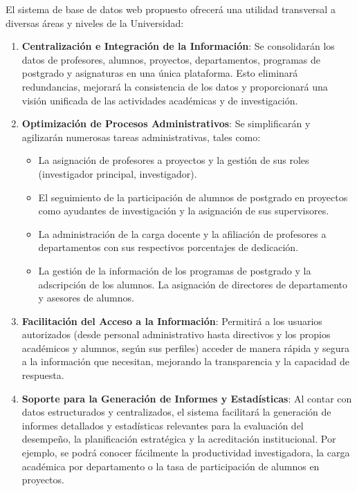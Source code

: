 El sistema de base de datos web propuesto ofrecerá una utilidad transversal a diversas áreas y niveles de la Universidad:
\begin{enumerate}
    \item \textbf{Centralización e Integración de la Información}: Se consolidarán los datos de profesores, alumnos, proyectos, departamentos, programas de postgrado y asignaturas en una única plataforma. Esto eliminará redundancias, mejorará la consistencia de los datos y proporcionará una visión unificada de las actividades académicas y de investigación.
\item \textbf{Optimización de Procesos Administrativos}: Se simplificarán y agilizarán numerosas tareas administrativas, tales como:
\begin{itemize}
    \item La asignación de profesores a proyectos y la gestión de sus roles (investigador principal, investigador).
\item El seguimiento de la participación de alumnos de postgrado en proyectos como ayudantes de investigación y la asignación de sus supervisores.
\item La administración de la carga docente y la afiliación de profesores a departamentos con sus respectivos porcentajes de dedicación.
\item La gestión de la información de los programas de postgrado y la adscripción de los alumnos.
La asignación de directores de departamento y asesores de alumnos.
\end{itemize}
\item \textbf{Facilitación del Acceso a la Información}: Permitirá a los usuarios autorizados (desde personal administrativo hasta directivos y los propios académicos y alumnos, según sus perfiles) acceder de manera rápida y segura a la información que necesitan, mejorando la transparencia y la capacidad de respuesta.
\item \textbf{Soporte para la Generación de Informes y Estadísticas}: Al contar con datos estructurados y centralizados, el sistema facilitará la generación de informes detallados y estadísticas relevantes para la evaluación del desempeño, la planificación estratégica y la acreditación institucional. Por ejemplo, se podrá conocer fácilmente la productividad investigadora, la carga académica por departamento o la tasa de participación de alumnos en proyectos.
\end{enumerate}

